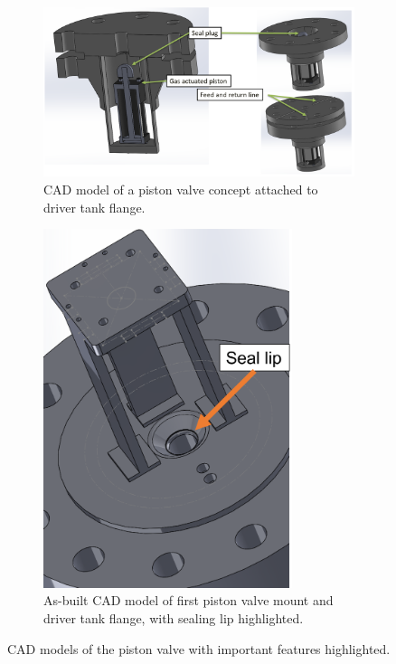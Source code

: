 \begin{figure}[b!]
    \vspace{16pt}
    \centering
    \begin{subfigure}[t]{0.6\textwidth}
        \centering
        \includegraphics[width=\textwidth]{design/photos/PistonValve_Gen1_CAD_labels.PNG}
        \caption{CAD model of a piston valve concept attached to driver tank flange.}
        \label{fig:cad concept}
    \end{subfigure}
    \hfill
    \begin{subfigure}[t]{0.35\textwidth}
        \centering
        \includegraphics[width=0.8\textwidth]{design/photos/PistonMount_CAD_lip.PNG}
        \caption{As-built CAD model of first piston valve mount and driver tank flange, with sealing lip highlighted.}
        \label{fig:cad lip}
    \end{subfigure}
    \caption{CAD models of the piston valve with important features highlighted.}
    \label{fig:cad gen 1}
    \vspace{16pt}
\end{figure}
